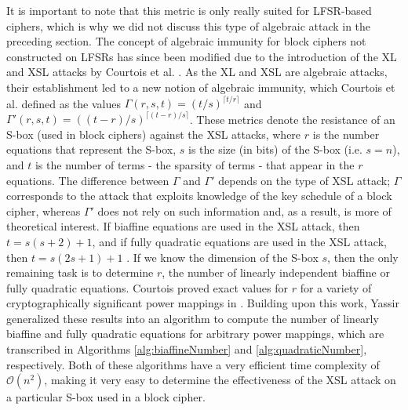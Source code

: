 It is important to note that this metric is only really suited for LFSR-based ciphers, which is why we did not discuss this type of algebraic attack in the preceding section. The concept of algebraic immunity for block ciphers not constructed on LFSRs has since been modified due to the introduction of the XL and XSL attacks by Courtois et al. \cite{Courtois02-1}. As the XL and XSL are algebraic attacks, their establishment led to a new notion of algebraic immunity, which Courtois et al. defined as the values $\Gamma(r, s, t) = (t/s)^{\lceil t/r \rceil}$ and $\Gamma'(r,s,t) = ((t - r)/s)^{\lceil (t - r)/s \rceil}$. These metrics denote the resistance of an S-box (used in block ciphers) against the XSL attacks, where $r$ is the number equations that represent the S-box, $s$ is the size (in bits) of the S-box (i.e. $s = n$), and $t$ is the number of terms - the sparsity of terms - that appear in the $r$ equations. The difference between $\Gamma$ and $\Gamma'$ depends on the type of XSL attack; $\Gamma$ corresponds to the attack that exploits knowledge of the key schedule of a block cipher, whereas $\Gamma'$ does not rely on such information and, as a result, is more of theoretical interest. If biaffine equations are used in the XSL attack, then $t = s(s + 2) + 1$, and if fully quadratic equations are used in the XSL attack, then $t = s(2s + 1) + 1$ \cite{Courtois05-1}. If we know the dimension of the S-box $s$, then the only remaining task is to determine $r$, the number of linearly independent biaffine or fully quadratic equations. Courtois proved exact values for $r$ for a variety of cryptographically significant power mappings in \cite{Courtois05-1}. Building upon this work, Yassir \cite{Nawaz09-1} generalized these results into an algorithm to compute the number of linearly biaffine and fully quadratic equations for arbitrary power mappings, which are transcribed in Algorithms \ref{alg:biaffineNumber} and \ref{alg:quadraticNumber}, respectively. Both of these algorithms have a very efficient time complexity of $\mathcal{O}(n^2)$, making it very easy to determine the effectiveness of the XSL attack on a particular S-box used in a block cipher. 

